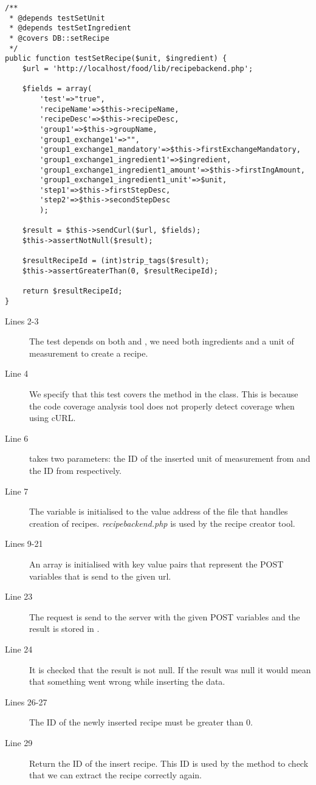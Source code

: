 \begin{lstlisting}[language=phpstyle]
/**
 * @depends testSetUnit
 * @depends testSetIngredient
 * @covers DB::setRecipe
 */
public function testSetRecipe($unit, $ingredient) {
    $url = 'http://localhost/food/lib/recipebackend.php';

    $fields = array(
        'test'=>"true",
        'recipeName'=>$this->recipeName,
        'recipeDesc'=>$this->recipeDesc,
        'group1'=>$this->groupName,
        'group1_exchange1'=>"",
        'group1_exchange1_mandatory'=>$this->firstExchangeMandatory,
        'group1_exchange1_ingredient1'=>$ingredient,
        'group1_exchange1_ingredient1_amount'=>$this->firstIngAmount,
        'group1_exchange1_ingredient1_unit'=>$unit,
        'step1'=>$this->firstStepDesc,
        'step2'=>$this->secondStepDesc
        );
    
    $result = $this->sendCurl($url, $fields);
    $this->assertNotNull($result);
        
    $resultRecipeId = (int)strip_tags($result);
    $this->assertGreaterThan(0, $resultRecipeId);
    
    return $resultRecipeId;
}
\end{lstlisting}

\begin{description}
\item[Lines 2-3] The test depends on both  and , we need both ingredients and a unit of measurement to create a recipe.
\item[Line 4] We specify that this test covers the  method in the  class. This is because the code coverage analysis tool does not properly detect coverage when using cURL\cite{curl}.
\item[Line 6]  takes two parameters: the ID of the inserted unit of measurement from  and the ID from  respectively.
\item[Line 7] The  variable is initialised to the value address of the file that handles creation of recipes. \textit{recipebackend.php} is used by the recipe creator tool.%
\item[Lines 9-21] An array is initialised with key value pairs that represent the POST variables that is send to the given url.
\item[Line 23] The request is send to the server with the given POST variables and the result is stored in .%
\item[Line 24] It is checked that the result is not null. If the result was null it would mean that something went wrong while inserting the data.
\item[Lines 26-27] The ID of the newly inserted recipe must be greater than 0.
\item[Line 29] Return the ID of the insert recipe. This ID is used by the \linebreak{} method to check that we can extract the recipe correctly again.
\end{description}

